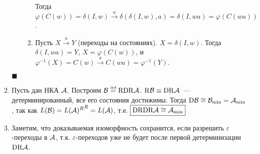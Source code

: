 \documentclass[a4paper]{article}
\def\A{{\cal A}}
\def\B{{\cal B}}
\def\eqdef{\overset{\mbox{\tiny def}}{=}}
\def\D{{\mathrm{D}}}
\def\R{{\mathrm{R}}}
\begin{document}
\begin{enumerate}
\begin{enumerate}
\begin{enumerate}
Тогда $\varphi(C(w))=\delta(I,w)\overset{a}{\to}\delta(\delta(I,w),a)=\delta(I,wa)=\varphi(C(wa))$.
\item Пусть $X\overset{a}{\to}Y$ (переходы на состояниях).\newline
$X=\delta(I,w)$. Тогда $\delta(I,wa)=Y$, $X=\varphi(C(w))$, и $\varphi^{-1}(X)=C(w)\overset{a}{\to}C(wa)=\varphi^{-1}(Y)$.
\end{enumerate}
\end{enumerate}
$\blacksquare$
\item Пусть дан НКА $\A$. Построим $\B\eqdef\R\D\R\A$. $\R\B\equiv\D\R\A$~--- детерминированный, все его состояния достижимы. Тогда $\D\B\cong\B_{\min}=\A_{\min}$, так как $L(\B)={L(\A)^{R}}^{R}=L(\A)$, т.е. $\boxed{\D\R\D\R\A\cong\A_{\min}}$
\item Заметим, что доказываемая изоморфность сохранится, если разрешить $\varepsilon$-переходы в $\A$, т.к. $\varepsilon$-переходов уже не будет после первой детерминизации $\D\R\A$.
\end{enumerate}
\end{document}
